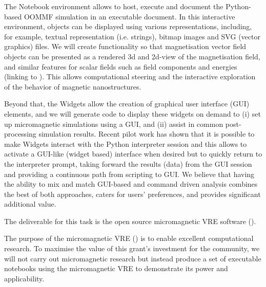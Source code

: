 \begin{workpackage}
\begin{tasklist}
\begin{task}[lead=USO,title=Case study: micromagnetic VRE built from
  \TheProject,id=oommf-py-ipython-attributes,PM=6,partners={SR,USH}]
  The \Jupyter Notebook environment allows to host,
  execute and document the Python-based OOMMF simulation in an
  executable document. In this interactive environment, objects can be
  displayed using various representations, including, for example,
  textual representation (i.e. strings), bitmap images and SVG (vector
  graphics) files. We will create functionality so that magnetisation vector
  field objects can be presented as a rendered 3d and 2d-view of the
  magnetisation field, and similar features for scalar fields such as
  field components and energies (linking to
  ). This allows computational steering and the
  interactive exploration of the behavior of magnetic
  nanostructures.

  Beyond that, the \Jupyter Widgets allow the creation of graphical
  user interface (GUI) elements, and we will generate code to
  display these widgets on demand to (i) set up micromagnetic
  simulations using a GUI, and (ii) assist in common post-processing
  simulation results. Recent pilot work has shown that it is possible
  to make \Jupyter Widgets interact with the Python interpreter
  session and this allows to activate a GUI-like (widget based)
  interface when desired but to quickly return to the interpreter
  prompt, taking forward the results (data) from the GUI session
  \cite{IPython-widget-GUI-demo-youtube-2014} and providing a
  continuous path from scripting to GUI. We believe that having the
  ability to mix and match GUI-based and command driven analysis
  combines the best of both approaches, caters for users' preferences,
  and provides significant additional value.

  The deliverable for this task is the open source micromagnetic VRE
  software ().
\end{task}

\begin{task}[lead=USO,title=Demonstrator: micromagnetic VRE notebooks,
  id=oommf-tutorial-and-documentation, PM=6, partners={SR,PS}]

  The purpose of the micromagnetic VRE
  () is to enable excellent
  computational research. To maximise the value of this grant's investment for the
  community, we will not carry out micromagnetic research but instead
  produce a set of executable notebooks using the micromagnetic VRE
  to demonstrate its power and applicability.


\end{task}
\end{tasklist}
\end{workpackage}
